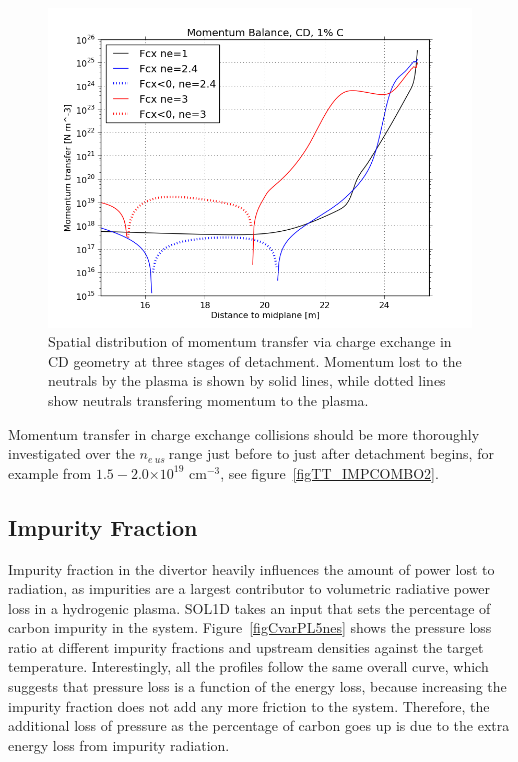\documentclass[12pt]{article}  %
\providecommand{\e}[1]{\ensuremath{\times 10^{#1}}} %
\providecommand{\pow}[1]{{$^{#1}$}} %
\providecommand{\neus}{$n_{e~us}~$} %
\begin{document}
\begin{figure}
\includegraphics[scale=0.5]{Figures/sol1d/balFcx16m.png}
\centering
\caption{Spatial distribution of momentum transfer via charge exchange in CD geometry at three stages of detachment. Momentum lost to the neutrals by the plasma is shown by solid lines, while dotted lines show neutrals transfering momentum to the plasma.}\label{figbalFcx16m}
\end{figure}

Momentum transfer in charge exchange collisions should be more thoroughly investigated over the \neus range just before to just after detachment begins, for example from $1.5 - 2.0\e{19}$ cm\pow{-3}, see figure~\ref{figTT_IMPCOMBO2}.



\subsection{Impurity Fraction}\label{ssecImpfrac}
Impurity fraction in the divertor heavily influences the amount of power lost to radiation, as impurities are a largest contributor to volumetric radiative power loss in a hydrogenic plasma. SOL1D takes an input that sets the percentage of carbon impurity in the system. Figure~\ref{figCvarPL5nes} shows the pressure loss ratio at different impurity fractions and upstream densities against the target temperature. Interestingly, all the profiles follow the same overall curve, which suggests that pressure loss is a function of the energy loss, because increasing the impurity fraction does not add any more friction to the system. Therefore, the additional loss of pressure as the percentage of carbon goes up is due to the extra energy loss from impurity radiation.
\end{document}
